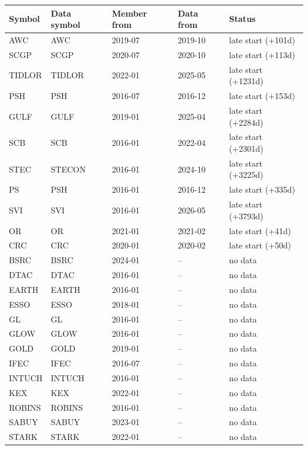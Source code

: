 \begin{tabular}{lllll}
\toprule
Symbol & Data symbol & Member from & Data from & Status \\
\midrule
AWC & AWC & 2019-07 & 2019-10 & late start (+101d) \\
SCGP & SCGP & 2020-07 & 2020-10 & late start (+113d) \\
TIDLOR & TIDLOR & 2022-01 & 2025-05 & late start (+1231d) \\
PSH & PSH & 2016-07 & 2016-12 & late start (+153d) \\
GULF & GULF & 2019-01 & 2025-04 & late start (+2284d) \\
SCB & SCB & 2016-01 & 2022-04 & late start (+2301d) \\
STEC & STECON & 2016-01 & 2024-10 & late start (+3225d) \\
PS & PSH & 2016-01 & 2016-12 & late start (+335d) \\
SVI & SVI & 2016-01 & 2026-05 & late start (+3793d) \\
OR & OR & 2021-01 & 2021-02 & late start (+41d) \\
CRC & CRC & 2020-01 & 2020-02 & late start (+50d) \\
BSRC & BSRC & 2024-01 & -- & no data \\
DTAC & DTAC & 2016-01 & -- & no data \\
EARTH & EARTH & 2016-01 & -- & no data \\
ESSO & ESSO & 2018-01 & -- & no data \\
GL & GL & 2016-01 & -- & no data \\
GLOW & GLOW & 2016-01 & -- & no data \\
GOLD & GOLD & 2019-01 & -- & no data \\
IFEC & IFEC & 2016-07 & -- & no data \\
INTUCH & INTUCH & 2016-01 & -- & no data \\
KEX & KEX & 2022-01 & -- & no data \\
ROBINS & ROBINS & 2016-01 & -- & no data \\
SABUY & SABUY & 2023-01 & -- & no data \\
STARK & STARK & 2022-01 & -- & no data \\
\bottomrule
\end{tabular}
